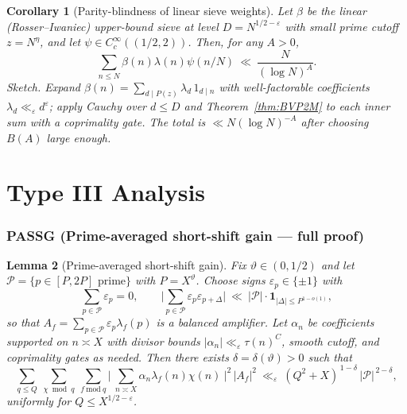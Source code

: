 \documentclass[11pt]{article}
\newtheorem{lemma}{Lemma}[part]
\newtheorem{corollary}[lemma]{Corollary}
\theoremstyle{definition}
\theoremstyle{remark}
\numberwithin{equation}{part}
\begin{document}
\begin{corollary}[Par\-ity-blindness of linear sieve weights]\label{cor:parityblind}
	Let $\beta$ be the linear (Rosser–Iwaniec) upper-bound sieve at level $D=N^{1/2-\varepsilon}$ with small prime cutoff $z=N^{\eta}$, and let $\psi\in C_c^\infty((1/2,2))$. Then, for any $A>0$,
	\[
		\sum_{n\le N}\beta(n)\lambda(n)\psi(n/N)\ \ll\ \frac{N}{(\log N)^A}.
	\]
	\emph{Sketch.} Expand $\beta(n)=\sum_{d\mid P(z)}\lambda_d\,1_{d\mid n}$ with well-factorable coefficients $\lambda_d\ll_\varepsilon d^\varepsilon$; apply Cauchy over $d\le D$ and Theorem~\ref{thm:BVP2M} to each inner sum with a coprimality gate. The total is $\ll N(\log N)^{-A}$ after choosing $B(A)$ large enough.
\end{corollary}


\part{Type III Analysis}

\section{PASSG (Prime-averaged short-shift gain — full proof)}

\begin{lemma}[Prime-averaged short-shift gain]\label{lem:PASSG}
	Fix $\vartheta\in(0,1/2)$ and let $\mathcal P=\{p\in[P,2P]\text{ prime}\}$ with $P=X^\vartheta$.
	Choose signs $\varepsilon_p\in\{\pm1\}$ with
	\[
		\sum_{p\in\mathcal P}\varepsilon_p=0,
		\qquad
		\Big|\sum_{p\in\mathcal P}\varepsilon_p\varepsilon_{p+\Delta}\Big|
		\ \ll\ |\mathcal P|\cdot\mathbf1_{|\Delta|\le P^{1-o(1)}},
	\]
	so that $A_f=\sum_{p\in\mathcal P}\varepsilon_p\lambda_f(p)$ is a balanced amplifier.
	Let $\alpha_n$ be coefficients supported on $n\asymp X$ with divisor bounds $|\alpha_n|\ll_\varepsilon \tau(n)^C$, smooth cutoff, and coprimality gates as needed.
	Then there exists $\delta=\delta(\vartheta)>0$ such that
	\begin{equation}\label{eq:S2.4_goal}
		\sum_{q\le Q}\ \sum_{\chi\bmod q}\ \sum_{f\ \mathrm{mod}\ q}
		\Bigg|\ \sum_{n\asymp X}\alpha_n \lambda_f(n)\chi(n)\ \Bigg|^2\,|A_f|^2
		\ \ll_\varepsilon\ (Q^2+X)^{\,1-\delta}\,|\mathcal P|^{\,2-\delta},
	\end{equation}
	uniformly for $Q\le X^{1/2-\varepsilon}$.
\end{lemma}
\end{document}
